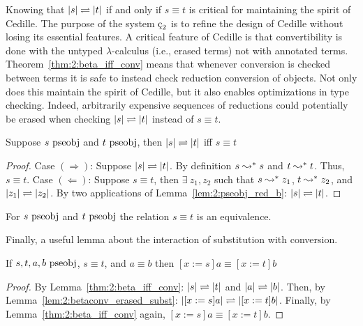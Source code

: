Knowing that $|s| \rightleftharpoons |t|$ if and only if $s \equiv t$ is critical for maintaining the spirit of Cedille.
The purpose of the system $\ced$ is to refine the design of Cedille without losing its essential features.
A critical feature of Cedille is that convertibility is done with the untyped $\lambda$-calculus (i.e., erased terms) not with annotated terms.
Theorem~\ref{thm:2:beta_iff_conv} means that whenever conversion is checked between terms it is safe to instead check reduction conversion of objects.
Not only does this maintain the spirit of Cedille, but it also enables optimizations in type checking.
Indeed, arbitrarily expensive sequences of reductions could potentially be erased when checking $|s| \rightleftharpoons |t|$ instead of $s \equiv t$.

\begin{theorem}
    Suppose $s~\textnormal{pseobj}$ and $t~\textnormal{pseobj}$, then $|s| \rightleftharpoons |t|$ iff $s \equiv t$
    \label{thm:2:beta_iff_conv}
\end{theorem}
\begin{proof}
    Case $(\Rightarrow)$:
    Suppose $|s| \rightleftharpoons |t|$.
    By definition $s \leadsto^* s$ and $t \leadsto^* t$.
    Thus, $s \equiv t$.
    Case $(\Leftarrow)$:
    Suppose $s \equiv t$, then $\exists\ z_1, z_2$ such that $s \leadsto^* z_1$, $t \leadsto^* z_2$, and $|z_1| \rightleftharpoons |z_2|$.
    By two applications of Lemma~\ref{lem:2:pseobj_red_b}: $|s| \rightleftharpoons |t|$.
\end{proof}

\begin{corollary}
    For $s~\textnormal{pseobj}$ and $t~\textnormal{pseobj}$ the relation $s \equiv t$ is an equivalence.
\end{corollary}

Finally, a useful lemma about the interaction of substitution with conversion.

\begin{lemma}
    If $s, t, a, b~\textnormal{pseobj}$, $s \equiv t$, and $a \equiv b$ then $[x := s]a \equiv [x := t]b$
    \label{lem:2:conv_subst}
\end{lemma}
\begin{proof}
    By Lemma~\ref{thm:2:beta_iff_conv}: $|s| \rightleftharpoons |t|$ and $|a| \rightleftharpoons |b|$.
    Then, by Lemma~\ref{lem:2:betaconv_erased_subst}: $|[x := s]a| \rightleftharpoons |[x := t]b|$.
    Finally, by Lemma~\ref{thm:2:beta_iff_conv} again, $[x := s]a \equiv [x := t]b$.
\end{proof}

